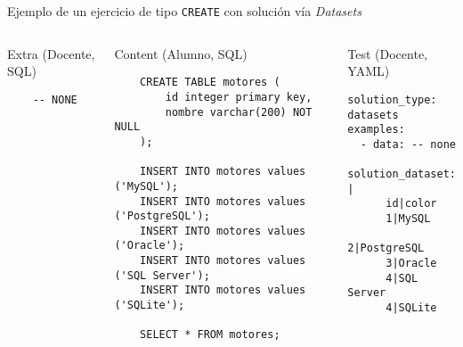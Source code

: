 Ejemplo de un ejercicio de tipo \texttt{CREATE} con solución vía \textit{Datasets}

\begin{columns}[t]
    \begin{listing}[H]
        \caption{Extra (Docente, SQL)}
        \begin{verbatim}
    -- NONE
        \end{verbatim}
    \end{listing}

    \vspace{-1em}
    \begin{listing}[H]
        \caption{Content (Alumno, SQL)}
        \begin{verbatim}
    CREATE TABLE motores (
        id integer primary key,
        nombre varchar(200) NOT NULL
    );

    INSERT INTO motores values ('MySQL');
    INSERT INTO motores values ('PostgreSQL');
    INSERT INTO motores values ('Oracle');
    INSERT INTO motores values ('SQL Server');
    INSERT INTO motores values ('SQLite');

    SELECT * FROM motores;
        \end{verbatim}
    \end{listing}

    \begin{listing}[H]
        \caption{Test (Docente, YAML)}
        \begin{verbatim}
solution_type: datasets
examples:
  - data: -- none
    solution_dataset: |
      id|color
      1|MySQL
      2|PostgreSQL
      3|Oracle
      4|SQL Server
      4|SQLite
        \end{verbatim}
    \end{listing}

\end{columns}
